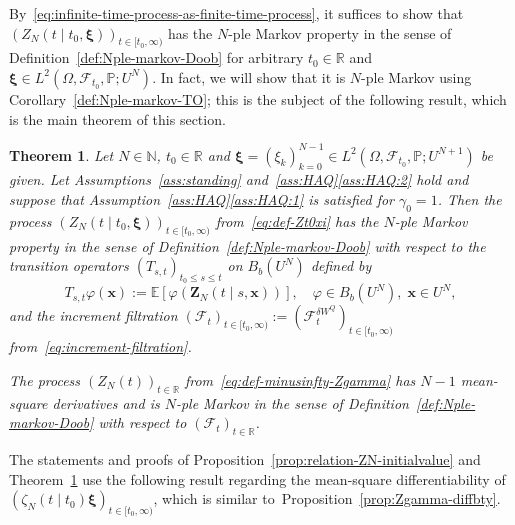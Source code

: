 \documentclass[reqno]{amsart}
\numberwithin{equation}{section}
\newcommand{\bbP}{\mathbb{P}}
\newcommand{\bbR}{\mathbb{R}}
\newcommand{\R}{\mathbb{R}}
\newcommand{\N}{\mathbb{N}}
\newcommand{\E}{\mathbb{E}}
\newcommand{\cF}{\mathcal{F}}
\newtheorem{theorem}[lemma]{Theorem}
\theoremstyle{remark}
\theoremstyle{definition}
\begin{document}
%
By~\eqref{eq:infinite-time-process-as-finite-time-process}, it suffices to 
show that $(Z_N(t \mid t_0, \bm\xi))_{t \in [t_0, \infty)}$
has the $N$-ple Markov property in the sense of Definition~\ref{def:Nple-markov-Doob}
for arbitrary $t_0 \in \R$ and $\bm\xi \in L^2(\Omega, \cF_{t_0}, \bbP; U^N)$.
In fact, we will show that it is $N$-ple Markov using
Corollary~\ref{def:Nple-markov-TO}; this is the 
subject of the following result, which is the main theorem of this section.
%
\begin{theorem}\label{thm:Nple-Markov-ZN}
	Let $N \in \N$, $t_0 \in \bbR$ and 
	$\bm\xi = (\xi_k)_{k=0}^{N-1} \in L^2(\Omega, \cF_{t_0},\bbP; U^{N+1})$
	be given.
	Let Assumptions~\textup{\ref{ass:standing} and~\ref{ass:HAQ}\ref{ass:HAQ:2}} hold
	and suppose that Assumption~\textup{\ref{ass:HAQ}\ref{ass:HAQ:1}} is satisfied for $\gamma_0 = 1$.
	Then the process $(Z_N(t \mid t_0, \bm{\xi}))_{t\in[t_0,\infty)}$ from~\eqref{eq:def-Zt0xi}
	has the $N$-ple Markov property in the sense of Definition~\textup{\ref{def:Nple-markov-Doob}}
	with respect to the transition operators
	$(T_{s,t})_{t_0 \le s \le t}$ on $B_b(U^N)$ defined by
	\begin{equation}\label{eq:transition-Z}
		T_{s, t}\varphi(\mathbf x) := \E[\varphi(\mathbf Z_N(t \mid s, \mathbf x))],
		\quad
		\varphi \in B_b(U^N), 
		\;
		\mathbf x \in U^N,
	\end{equation}
	and the increment filtration $(\cF_t)_{t\in[t_0, \infty)} := (\cF_t^{\delta W^Q})_{t\in[t_0, \infty)}$
	from~\eqref{eq:increment-filtration}.
	
	The process $(Z_N(t))_{t\in \bbR}$ from~\eqref{eq:def-minusinfty-Zgamma}
	has $N-1$ mean-square derivatives and
	is $N$-ple Markov in the sense of Definition~\ref{def:Nple-markov-Doob}
	with respect to $(\cF_t)_{t\in\bbR}$.
\end{theorem}
%
The statements and proofs of Proposition~\ref{prop:relation-ZN-initialvalue} and Theorem~\ref{thm:Nple-Markov-ZN} 
use the following result regarding the mean-square differentiability of 
$(\zeta_{N}(t \mid t_0)\bm\xi)_{t \in [t_0,\infty)}$, which is similar to~Proposition~\ref{prop:Zgamma-diffbty}.
%
\end{document}
